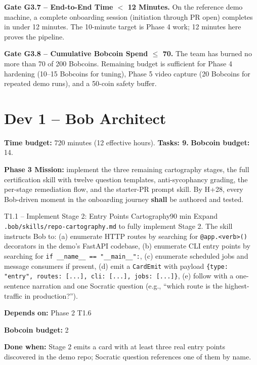 \documentclass[11pt,letterpaper]{article}
\newcommand{\acceptance}[1]{\par\smallskip\textcolor{ibmgreen}{\textbf{Done when:}} #1}
\newcommand{\depends}[1]{\par\smallskip\textcolor{ibmorange}{\textbf{Depends on:}} #1}
\newcommand{\bobcost}[1]{\par\smallskip\textcolor{ibmaccent}{\textbf{Bobcoin budget:}} #1}
\newcommand{\shall}{\textbf{shall}}
\begin{document}
\begin{gate}
\textbf{Gate G3.7 -- End-to-End Time $<$ 12 Minutes.} On the reference demo machine, a complete onboarding session (initiation through PR open) completes in under 12 minutes. The 10-minute target is Phase 4 work; 12 minutes here proves the pipeline.
\end{gate}

\begin{gate}
\textbf{Gate G3.8 -- Cumulative Bobcoin Spend $\leq$ 70.} The team has burned no more than 70 of 200 Bobcoins. Remaining budget is sufficient for Phase 4 hardening (10--15 Bobcoins for tuning), Phase 5 video capture (20 Bobcoins for repeated demo runs), and a 50-coin safety buffer.
\end{gate}

\section{Dev 1 -- Bob Architect}

\textbf{Time budget:} 720 minutes (12 effective hours). \textbf{Tasks: 9.} \textbf{Bobcoin budget:} 14.

\textbf{Phase 3 Mission:} implement the three remaining cartography stages, the full certification skill with twelve question templates, anti-sycophancy grading, the per-stage remediation flow, and the starter-PR prompt skill. By H+28, every Bob-driven moment in the onboarding journey \shall{} be authored and tested.

\begin{task}{T1.1 -- Implement Stage 2: Entry Points Cartography}{90 min}
Expand \texttt{.bob/skills/repo-cartography.md} to fully implement Stage 2. The skill instructs Bob to: (a) enumerate HTTP routes by searching for \texttt{@app.<verb>()} decorators in the demo's FastAPI codebase, (b) enumerate CLI entry points by searching for \texttt{if \_\_name\_\_ == "\_\_main\_\_":}, (c) enumerate scheduled jobs and message consumers if present, (d) emit a \texttt{CardEmit} with payload \texttt{\{type: "entry", routes: [...], cli: [...], jobs: [...]\}}, (e) follow with a one-sentence narration and one Socratic question (e.g., ``which route is the highest-traffic in production?'').
\depends{Phase 2 T1.6}
\bobcost{2}
\acceptance{Stage 2 emits a card with at least three real entry points discovered in the demo repo; Socratic question references one of them by name.}
\end{task}
\end{document}
